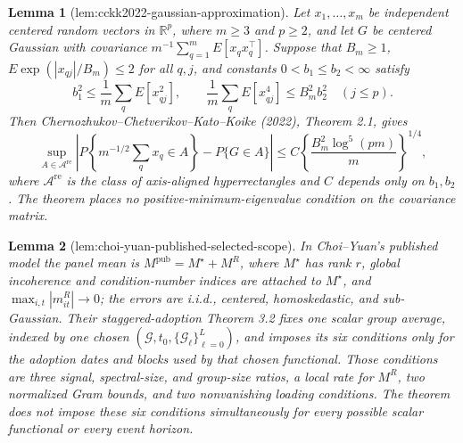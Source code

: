 \documentclass{article}
\newtheorem{lemma}{Lemma}
\begin{document}
\begin{lemma}[lem:cckk2022-gaussian-approximation]\label{lem:cckk2022-gaussian-approximation}
Let \(x_1,\ldots,x_m\) be independent centered random vectors in
\(\mathbb R^p\), where \(m\ge3\) and \(p\ge2\), and let
\(G\) be centered Gaussian with covariance
\(m^{-1}\sum_{q=1}^mE[x_qx_q^\top]\).  Suppose that \(B_m\ge1\),
\(E\exp(|x_{qj}|/B_m)\le2\) for all \(q,j\), and constants
\(0<b_1\le b_2<\infty\) satisfy
\[
 b_1^2\le \frac1m\sum_qE[x_{qj}^2],
 \qquad
 \frac1m\sum_qE[x_{qj}^4]\le B_m^2b_2^2
 \quad(j\le p).
\]
Then Chernozhukov--Chetverikov--Kato--Koike (2022), Theorem 2.1, gives
\[
 \sup_{A\in\mathcal A^{\mathrm{re}}}
 \left|P\!\left\{m^{-1/2}\sum_qx_q\in A\right\}-P\{G\in A\}\right|
 \le C\left\{\frac{B_m^2\log^5(pm)}m\right\}^{1/4},
\]
where \(\mathcal A^{\mathrm{re}}\) is the class of axis-aligned
hyperrectangles and \(C\) depends only on \(b_1,b_2\).  The theorem
places no positive-minimum-eigenvalue condition on the covariance matrix.
\end{lemma}

\begin{lemma}[lem:choi-yuan-published-selected-scope]\label{lem:choi-yuan-published-selected-scope}
In Choi--Yuan's published model the panel mean is
\(M^{\mathrm{pub}}=M^\star+M^R\), where \(M^\star\) has rank \(r\), global
incoherence and condition-number indices are attached to \(M^\star\),
and \(\max_{i,t}|m^R_{it}|\to0\); the errors are i.i.d., centered,
homoskedastic, and sub-Gaussian.  Their staggered-adoption Theorem 3.2
fixes one scalar group average, indexed by one chosen
\((\mathcal G,t_0,\{\mathcal G_\ell\}_{\ell=0}^L)\), and imposes its six
conditions only for the adoption dates and blocks used by that chosen
functional.  Those conditions are three signal, spectral-size, and
group-size ratios, a local rate for \(M^R\), two normalized Gram bounds,
and two nonvanishing loading conditions.  The theorem does not impose
these six conditions simultaneously for every possible scalar functional
or every event horizon.
\end{lemma}
\end{document}
